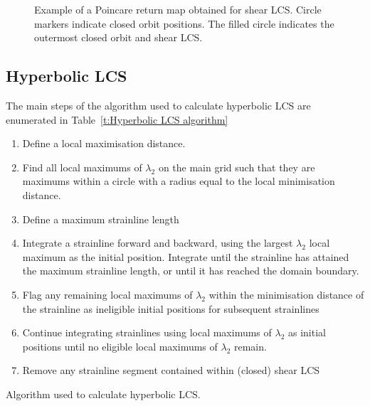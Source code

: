 \documentclass{article}
\begin{document}
\begin{figure}
\begin{center}
\end{center}
\caption{Example of a Poincare return map obtained for shear LCS. Circle markers indicate closed orbit positions. The filled circle indicates the outermost closed orbit and shear LCS.}
\label{f:Poincare return map}
\end{figure}

\subsection{Hyperbolic LCS}

The main steps of the algorithm used to calculate hyperbolic LCS are enumerated in Table~\ref{t:Hyperbolic LCS algorithm}

\begin{table}
\begin{enumerate}
\item Define a local maximisation distance.
\item Find all local maximums of $\lambda_2$ on the main grid such that they are maximums within a circle with a radius equal to the local minimisation distance.
\item Define a maximum strainline length
\item Integrate a strainline forward and backward, using the largest $\lambda_2$ local maximum as the initial position. Integrate until the strainline has attained the maximum strainline length, or until it has reached the domain boundary.
\item Flag any remaining local maximums of $\lambda_2$ within the minimisation distance of the strainline as ineligible initial positions for subsequent strainlines
\item Continue integrating strainlines using local maximums of $\lambda_2$ as initial positions until no eligible local maximums of $\lambda_2$ remain.
\item Remove any strainline segment contained within (closed) shear LCS
\end{enumerate}
\caption{Algorithm used to calculate hyperbolic LCS.}
\label{t:Hyperbolic LCS algorithm}
\end{table}
\end{document}

